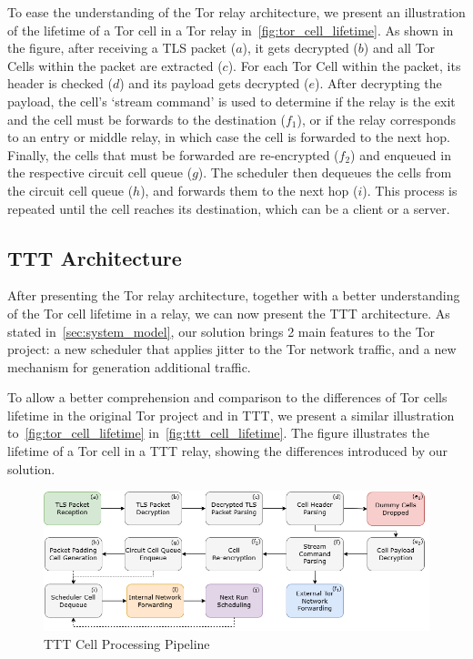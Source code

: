 To ease the understanding of the Tor relay architecture, we present an  illustration of the lifetime of a Tor cell in a Tor relay in~\autoref{fig:tor_cell_lifetime}. As shown in the figure, after receiving a TLS packet (\(a\)), it gets decrypted (\(b\)) and all Tor Cells within the packet are extracted (\(c\)). For each Tor Cell within the packet, its header is checked (\(d\))  and its payload gets decrypted (\(e\)). After decrypting the payload, the cell's `stream command' is used to determine if the relay is the exit and the cell must be forwards to the destination (\(f_1\)), or if the relay corresponds to an entry or middle relay, in which case the cell is forwarded to the next hop. Finally, the cells that must be forwarded are re-encrypted (\(f_2\)) and enqueued in the respective circuit cell queue (\(g\)). The scheduler then dequeues the cells from the circuit cell queue (\(h\)), and forwards them to the next hop (\(i\)). This process is repeated until the cell reaches its destination, which can be a client or a server. 


\subsection{TTT Architecture}\label{sec:ttt_architecture}

After presenting the Tor relay architecture, together with a better understanding of the Tor cell lifetime in a relay, we can now present the TTT architecture. As stated in~\autoref{sec:system_model}, our solution brings 2 main features to the Tor project: a new scheduler that applies jitter to the Tor network traffic, and a new mechanism for generation additional traffic.

To allow a better comprehension and comparison to the differences of Tor cells lifetime in the original Tor project and in TTT, we present a similar illustration to~\autoref{fig:tor_cell_lifetime} in~\autoref{fig:ttt_cell_lifetime}. The figure illustrates the lifetime of a Tor cell in a TTT relay, showing the differences introduced by our solution.
\begin{figure}[!h]
  \centering
  \includegraphics[width=\textwidth]{Chapters/Figures/Solution_Cell_Pipeline.png}
  \caption{TTT Cell Processing Pipeline}\label{fig:ttt_cell_lifetime}
\end{figure}

